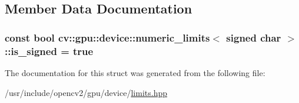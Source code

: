 \subsection{Member Data Documentation}
\hypertarget{structcv_1_1gpu_1_1device_1_1numeric__limits_3_01signed_01char_01_4_abcc8bcba4d2b4fc2c42794aeb78319b8}{
\subsubsection[{is\-\_\-signed}]{\setlength{\rightskip}{0pt plus 5cm}const bool {\bf cv\-::gpu\-::device\-::numeric\-\_\-limits}$<$ signed char $>$\-::is\-\_\-signed = {\bf true}\hspace{0.3cm}{\ttfamily [static]}}}\label{structcv_1_1gpu_1_1device_1_1numeric__limits_3_01signed_01char_01_4_abcc8bcba4d2b4fc2c42794aeb78319b8}


The documentation for this struct was generated from the following file\-:\begin{DoxyCompactItemize}
\item 
/usr/include/opencv2/gpu/device/\hyperlink{limits_8hpp}{limits.\-hpp}\end{DoxyCompactItemize}

